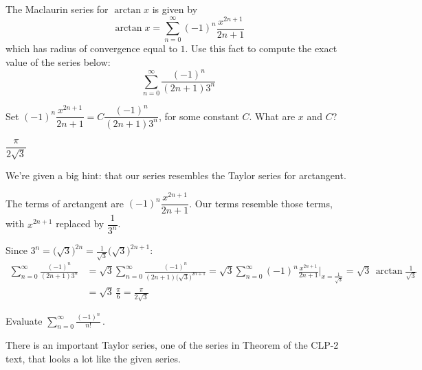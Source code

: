 \begin{Mquestion}[M105 2012A]\label{prob_s3.6evaluate1}
The Maclaurin series for $\arctan x$ is given by
\begin{equation*}
\arctan x = \sum_{n=0}^\infty (-1)^n\frac{x^{2n+1}}{2n+1}
\end{equation*}
which has radius of convergence equal to $1$. Use this fact to compute
the exact value of the series below:
\begin{equation*}
\sum_{n=0}^\infty \frac{(-1)^n}{(2n+1) 3^n}
\end{equation*}
\end{Mquestion}

\begin{hint}
Set $(-1)^n\dfrac{x^{2n+1}}{2n+1}=C\dfrac{(-1)^n}{(2n+1)3^n}$, for some constant $C$. What are $x$ and $C$?
\end{hint}

\begin{answer}
$\dfrac{\pi}{2\sqrt{3}}$
\end{answer}

\begin{solution}
	We're given a big hint: that our series resembles the Taylor series for arctangent.

	The terms of arctangent are $(-1)^n\dfrac{x^{2n+1}}{2n+1}$. Our terms resemble those terms, with $x^{2n+1}$ replaced by $\dfrac{1}{3^n}$.

Since  $3^n=\big(\sqrt{3}\big)^{2n}=\frac{1}{\sqrt{3}}\big(\sqrt{3}\big)^{2n+1}$:
\begin{align*}
\sum_{n=0}^\infty \frac{(-1)^n}{(2n+1) 3^n}
&=\sqrt{3} \sum_{n=0}^\infty \frac{(-1)^n}{(2n+1)\big(\sqrt{3}\big)^{2n+1} }
=\sqrt{3} \sum_{n=0}^\infty (-1)^n\frac{x^{2n+1}}{2n+1}
         \bigg|_{x=\frac{1}{\sqrt{3}}}
=\sqrt{3}\,\arctan\frac{1}{\sqrt{3}} \\
&=\sqrt{3}\,\frac{\pi}{6}
=\frac{\pi}{2\sqrt{3}}
\end{align*}
\end{solution}


\begin{question}[2014D]
Evaluate ${\displaystyle\sum_{n=0}^\infty\frac{(-1)^n}{n!}}\,$.
\end{question}

\begin{hint}
There is an important Taylor series, one of the series in
Theorem  of the
CLP-2 text, that looks a lot like the given series.
\end{hint}

